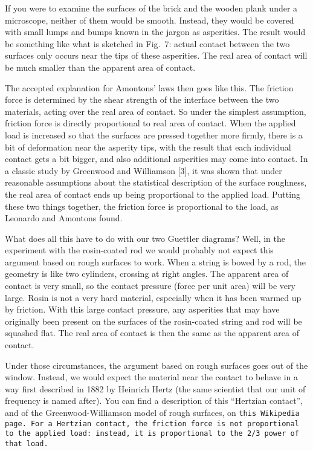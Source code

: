   If you were to examine the surfaces of the brick and the wooden plank under a 
  microscope, neither of them would be smooth. Instead, they would be covered 
  with small lumps and bumps known in the jargon as asperities. The result 
  would be something like what is sketched in Fig.\ 7: actual contact between 
  the two surfaces only occurs near the tips of these asperities. The real area 
  of contact will be much smaller than the apparent area of contact. 


  The accepted explanation for Amontons’ laws then goes like this. The friction 
  force is determined by the shear strength of the interface between the two 
  materials, acting over the real area of contact. So under the simplest 
  assumption, friction force is directly proportional to real area of contact. 
  When the applied load is increased so that the surfaces are pressed together 
  more firmly, there is a bit of deformation near the asperity tips, with the 
  result that each individual contact gets a bit bigger, and also additional 
  asperities may come into contact. In a classic study by Greenwood and 
  Williamson [3], it was shown that under reasonable assumptions about the 
  statistical description of the surface roughness, the real area of contact 
  ends up being proportional to the applied load. Putting these two things 
  together, the friction force is proportional to the load, as Leonardo and 
  Amontons found. 

  What does all this have to do with our two Guettler diagrams? Well, in the 
  experiment with the rosin-coated rod we would probably not expect this 
  argument based on rough surfaces to work. When a string is bowed by a rod, 
  the geometry is like two cylinders, crossing at right angles. The apparent 
  area of contact is very small, so the contact pressure (force per unit area) 
  will be very large. Rosin is not a very hard material, especially when it has 
  been warmed up by friction. With this large contact pressure, any asperities 
  that may have originally been present on the surfaces of the rosin-coated 
  string and rod will be squashed flat. The real area of contact is then the 
  same as the apparent area of contact. 

  Under those circumstances, the argument based on rough surfaces goes out of 
  the window. Instead, we would expect the material near the contact to behave 
  in a way first described in 1882 by Heinrich Hertz (the same scientist that 
  our unit of frequency is named after). You can find a description of this 
  “Hertzian contact”, and of the Greenwood-Williamson model of rough surfaces, 
  on \tt{}this Wikipedia page\rm{}. For a Hertzian contact, the friction force 
  is not proportional to the applied load: instead, it is proportional to the 
  2/3 power of that load. 

